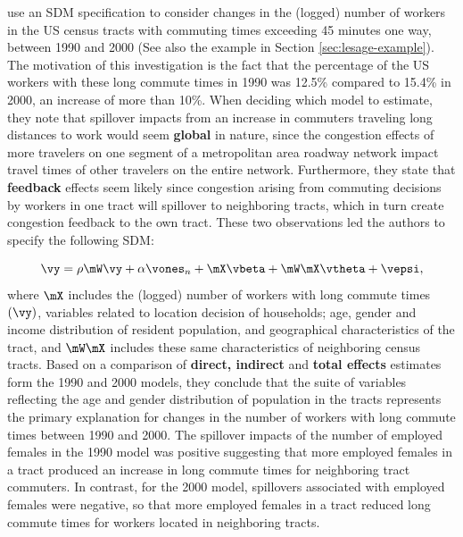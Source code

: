 \documentclass[english,12pt]{book}\usepackage[]{graphicx}\usepackage[]{xcolor}
\begin{document}
\begin{example}\label{example:commuting-Kirby}
\cite{kirby2009changes} use an SDM specification to consider changes in the (logged) number of workers in the US census tracts with commuting times exceeding 45 minutes one way, between 1990 and 2000 (See also the example in Section \ref{sec:lesage-example}). The motivation of this investigation is the fact that the percentage of the US workers with these long commute times in 1990 was 12.5\% compared to 15.4\% in 2000, an increase of more than 10\%. When deciding which model to estimate, they note that spillover impacts from an increase in commuters traveling long distances to work would seem \textbf{global} in nature, since the congestion effects of more travelers on one segment of a metropolitan area roadway network impact travel times of other travelers on the entire network. Furthermore, they state that \textbf{feedback} effects seem likely since congestion arising from commuting decisions by workers in one tract will spillover to neighboring tracts, which in turn create congestion feedback to the own tract. These two observations led the authors to specify the following SDM:

\begin{equation*}
  \vy = \rho\mW\vy + \alpha \vones_n + \mX\vbeta + \mW\mX\vtheta + \vepsi,
\end{equation*}
%
where $\mX$ includes the (logged) number of workers with long commute times $(\vy)$, variables related to location decision of households; age, gender and income distribution of resident population, and geographical characteristics of the tract, and $\mW\mX$ includes these same characteristics of neighboring census tracts. 
Based on a comparison of \textbf{direct, indirect} and \textbf{total effects} estimates form the 1990 and 2000 models, they conclude that the suite of variables reflecting the age and gender distribution of population in the tracts represents the primary explanation for changes in the number of workers with long commute times between 1990 and 2000. The spillover impacts of the number of employed females in the 1990 model was positive suggesting that more employed females in a tract produced an increase in long commute times for neighboring tract commuters. In contrast, for the 2000 model, spillovers associated with employed females were negative, so that more employed females in a tract reduced long commute times for workers located in neighboring tracts. 
\end{example}
\end{document}
